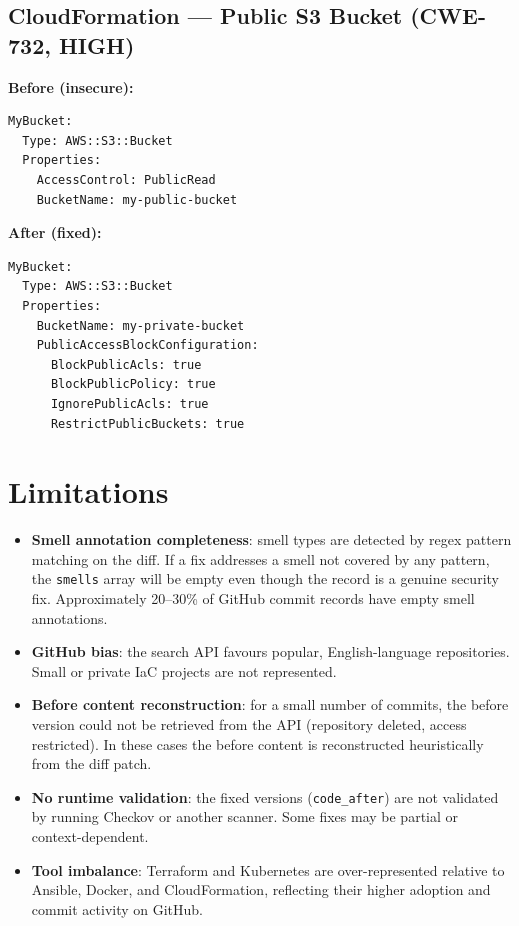\documentclass[11pt,a4paper]{article}
\begin{document}
\subsection{CloudFormation --- Public S3 Bucket (CWE-732, HIGH)}

\textbf{Before (insecure):}
\begin{lstlisting}[style=iac]
MyBucket:
  Type: AWS::S3::Bucket
  Properties:
    AccessControl: PublicRead
    BucketName: my-public-bucket
\end{lstlisting}

\textbf{After (fixed):}
\begin{lstlisting}[style=iac]
MyBucket:
  Type: AWS::S3::Bucket
  Properties:
    BucketName: my-private-bucket
    PublicAccessBlockConfiguration:
      BlockPublicAcls: true
      BlockPublicPolicy: true
      IgnorePublicAcls: true
      RestrictPublicBuckets: true
\end{lstlisting}

\section{Limitations}

\begin{itemize}[leftmargin=1.2cm]
  \item \textbf{Smell annotation completeness}: smell types are detected by regex pattern matching on the diff. If a fix addresses a smell not covered by any pattern, the \texttt{smells} array will be empty even though the record is a genuine security fix. Approximately 20--30\% of GitHub commit records have empty smell annotations.

  \item \textbf{GitHub bias}: the search API favours popular, English-language repositories. Small or private IaC projects are not represented.

  \item \textbf{Before content reconstruction}: for a small number of commits, the before version could not be retrieved from the API (repository deleted, access restricted). In these cases the before content is reconstructed heuristically from the diff patch.

  \item \textbf{No runtime validation}: the fixed versions (\texttt{code\_after}) are not validated by running Checkov or another scanner. Some fixes may be partial or context-dependent.

  \item \textbf{Tool imbalance}: Terraform and Kubernetes are over-represented relative to Ansible, Docker, and CloudFormation, reflecting their higher adoption and commit activity on GitHub.
\end{itemize}
\end{document}
